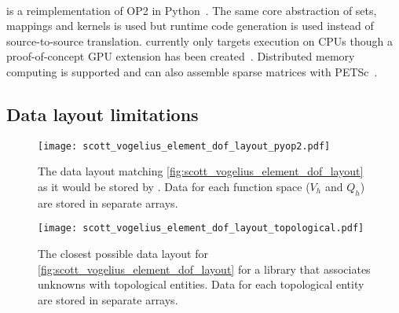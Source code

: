 \documentclass[thesis]{subfiles}
\begin{document}
\paragraph{}{
  is a reimplementation of OP2 in Python~\cite{rathgeberPyOP2HighLevelFramework2012}.
  The same core abstraction of sets, mappings and kernels is used but runtime code generation is used instead of source-to-source translation.
   currently only targets execution on CPUs though a proof-of-concept GPU extension has been created~\cite{fenics2021-kulkarni}.
  Distributed memory computing is supported and  can also assemble sparse matrices with PETSc~\cite{petsc-web-page,petsc-user-ref,petsc-efficient}.
}

\subsection{Data layout limitations}

\begin{figure}
  \centering
  \texttt{[image: scott\_vogelius\_element\_dof\_layout\_pyop2.pdf]}
  \caption{
    The data layout matching \cref{fig:scott_vogelius_element_dof_layout} as it would be stored by .
    Data for each function space ($V_h$ and $Q_h$) are stored in separate arrays.
  }
  \label{fig:scott_vogelius_element_dof_layout_pyop2}
\end{figure}

\begin{figure}
  \centering
  \texttt{[image: scott\_vogelius\_element\_dof\_layout\_topological.pdf]}
  \caption{
    The closest possible data layout for \cref{fig:scott_vogelius_element_dof_layout} for a library that associates unknowns with topological entities.
    Data for each topological entity are stored in separate arrays.
  }
  \label{fig:scott_vogelius_element_dof_layout_topological}
\end{figure}

\end{document}
